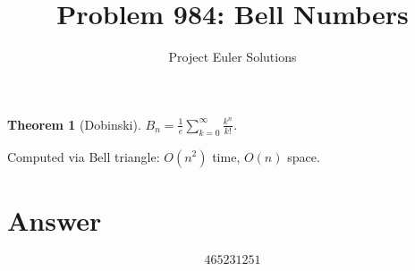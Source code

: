 \documentclass[11pt]{article}
\title{Problem 984: Bell Numbers}
\author{Project Euler Solutions}
\date{}
\newtheorem{theorem}{Theorem}
\begin{document}
\maketitle
\begin{theorem}[Dobinski]
$B_n = \frac{1}{e}\sum_{k=0}^\infty \frac{k^n}{k!}$.
\end{theorem}
Computed via Bell triangle: $O(n^2)$ time, $O(n)$ space.
\section{Answer}

\[
\boxed{465231251}
\]
\end{document}
